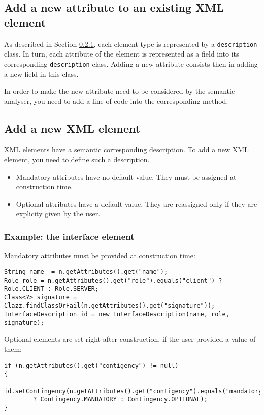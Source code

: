\documentclass{article}
\newcommand{\code}[1]{\texttt{#1}}
\begin{document}
\subsection{Add a new attribute to an existing XML element}

As described in Section \ref{}, each element type is represented by a \code{description} class.
In turn, each attribute of the element is represented as a field into its corresponding \code{description} class.
Adding a new attribute consists then in adding a new field in this class.

In order to make the new attribute need to be considered by the semantic analyser, you need
to add a line of code into the corresponding method.



\subsection{Add a new XML element}

XML elements have a semantic corresponding description. To add a new XML element, you need to define such a description.

\begin{itemize}
  \item Mandatory attributes have no default value. They must be assigned at construction time.
  \item Optional attributes have a default value. They are reassigned only if they are explicity given by the user.
\end{itemize}

\subsubsection{Example: the interface element}

Mandatory attributes must be provided at construction time:
\begin{tiny}
\begin{lstlisting}
String name  = n.getAttributes().get("name");
Role role = n.getAttributes().get("role").equals("client") ? Role.CLIENT : Role.SERVER;
Class<?> signature = Clazz.findClassOrFail(n.getAttributes().get("signature"));
InterfaceDescription id = new InterfaceDescription(name, role, signature);
\end{lstlisting}
\end{tiny}


Optional elements are set right after construction, if the user provided a value of them:
\begin{tiny}
\begin{lstlisting}
if (n.getAttributes().get("contigency") != null)
{
	id.setContingency(n.getAttributes().get("contigency").equals("mandatory")
		? Contingency.MANDATORY : Contingency.OPTIONAL);
}
\end{lstlisting}
\end{tiny}
\end{document}
